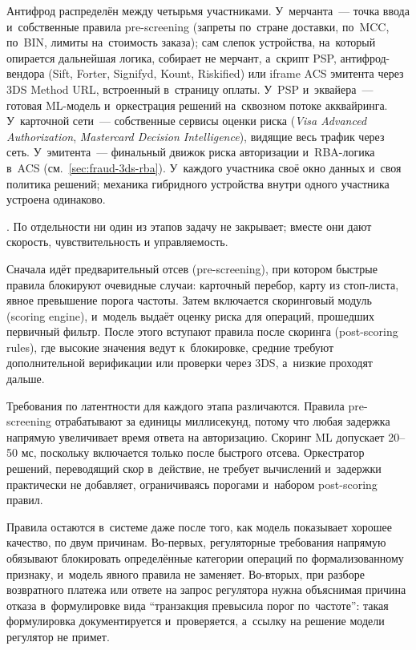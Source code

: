 Антифрод распределён между четырьмя участниками. У~мерчанта~---
точка ввода и~собственные правила pre-screening (запреты по~стране
доставки, по~MCC, по~BIN, лимиты на~стоимость заказа); сам слепок
устройства, на~который опирается дальнейшая логика, собирает не
мерчант, а~скрипт PSP, антифрод-вендора (Sift, Forter, Signifyd,
Kount, Riskified) или iframe ACS эмитента через 3DS Method URL,
встроенный в~страницу оплаты. У~PSP и~эквайера~--- готовая ML-модель
и~оркестрация решений на~сквозном потоке акквайринга. У~карточной
сети~--- собственные сервисы оценки риска (\textit{Visa Advanced
Authorization}, \textit{Mastercard Decision Intelligence}), видящие
весь трафик через сеть. У~эмитента~--- финальный движок риска
авторизации и~RBA-логика в~ACS (см.~\autoref{sec:fraud-3ds-rba}).
У~каждого участника своё окно данных и~своя политика решений;
механика гибридного устройства внутри одного участника устроена
одинаково.

. По отдельности ни один из этапов задачу не закрывает; вместе они
дают скорость, чувствительность и управляемость.

Сначала идёт предварительный
отсев (pre-screening), при котором быстрые правила блокируют
очевидные случаи: карточный перебор, карту из стоп-листа, явное
превышение порога частоты. Затем включается скоринговый модуль
(scoring engine), и~модель выдаёт оценку риска для операций, прошедших
первичный фильтр. После этого вступают правила после скоринга
(post-scoring rules), где высокие значения ведут к~блокировке,
средние требуют дополнительной верификации или проверки через 3DS,
а~низкие проходят дальше.

Требования по латентности для каждого этапа различаются. Правила
pre-screening отрабатывают за единицы миллисекунд, потому что любая
задержка напрямую увеличивает время ответа на авторизацию. Скоринг ML
допускает 20--50 мс, поскольку включается только после быстрого
отсева. Оркестратор решений, переводящий скор в~действие, не требует
вычислений и~задержки практически не добавляет, ограничиваясь
порогами и~набором post-scoring правил.

Правила остаются в~системе даже после того, как модель показывает
хорошее качество, по двум причинам. Во-первых, регуляторные требования
напрямую обязывают блокировать определённые категории операций по
формализованному признаку, и~модель явного правила не заменяет.
Во-вторых, при разборе возвратного платежа или ответе на запрос
регулятора нужна объяснимая причина отказа в~формулировке вида
\enquote{транзакция превысила порог по~частоте}: такая формулировка
документируется и~проверяется, а~ссылку на решение модели
регулятор не примет.

